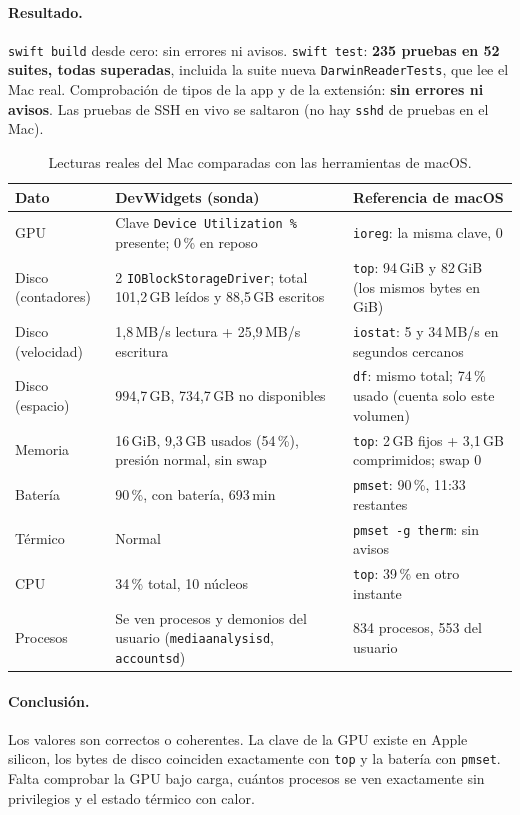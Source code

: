 \documentclass[11pt,a4paper]{article}
\begin{document}
\paragraph{Resultado.} \texttt{swift build} desde cero: sin errores ni
avisos. \texttt{swift test}: \textbf{235 pruebas en 52 suites, todas
superadas}, incluida la suite nueva \texttt{DarwinReaderTests}, que
lee el Mac real. Comprobación de tipos de la app y de la extensión:
\textbf{sin errores ni avisos}. Las pruebas de SSH en vivo se saltaron
(no hay \texttt{sshd} de pruebas en el Mac).

\begin{table}[H]
\centering
\begin{tabularx}{\textwidth}{@{}lXX@{}}
\toprule
\textbf{Dato} & \textbf{DevWidgets (sonda)} & \textbf{Referencia de
macOS}\\
\midrule
GPU & Clave \texttt{Device Utilization~\%} presente; 0\,\% en reposo &
\texttt{ioreg}: la misma clave, 0 \\
Disco (contadores) & 2 \texttt{IOBlockStorageDriver}; total 101,2\,GB
leídos y 88,5\,GB escritos & \texttt{top}: 94\,GiB y 82\,GiB (los mismos
bytes en GiB) \\
Disco (velocidad) & 1,8\,MB/s lectura + 25,9\,MB/s escritura &
\texttt{iostat}: 5 y 34\,MB/s en segundos cercanos \\
Disco (espacio) & 994,7\,GB, 734,7\,GB no disponibles & \texttt{df}:
mismo total; 74\,\% usado (cuenta solo este volumen) \\
Memoria & 16\,GiB, 9,3\,GB usados (54\,\%), presión normal, sin swap
& \texttt{top}: 2\,GB fijos + 3,1\,GB comprimidos; swap 0 \\
Batería & 90\,\%, con batería, 693\,min & \texttt{pmset}: 90\,\%,
11:33 restantes \\
Térmico & Normal & \texttt{pmset -g therm}: sin avisos \\
CPU & 34\,\% total, 10 núcleos & \texttt{top}: 39\,\% en otro
instante \\
Procesos & Se ven procesos y demonios del usuario
(\texttt{mediaanalysisd}, \texttt{accountsd}) & 834 procesos, 553 del
usuario \\
\bottomrule
\end{tabularx}
\caption{Lecturas reales del Mac comparadas con las herramientas de
macOS.}
\end{table}

\paragraph{Conclusión.} Los valores son correctos o coherentes. La
clave de la GPU existe en Apple silicon, los bytes de disco coinciden
exactamente con \texttt{top} y la batería con \texttt{pmset}. Falta
comprobar la GPU bajo carga, cuántos procesos se ven exactamente sin
privilegios y el estado térmico con calor.
\end{document}
